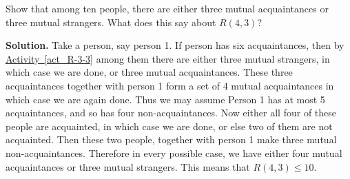 \documentclass{book}
\begin{document}
\setcounter{project}{49}
\addtocounter{project}{-1}
\begin{activity}[]\label{activity-42}
\hypertarget{p-439}{}%
Show that among ten people, there are either three mutual acquaintances or three mutual strangers.  What does this say about \(R(4,3)\)?%
\par\smallskip%
\noindent\textbf{Solution.}\hypertarget{solution-47}{}\quad%
\hypertarget{p-440}{}%
Take a person, say person 1. If person has six acquaintances, then by \hyperref[act_R-3-3]{Activity~\ref{act_R-3-3}} among them there are either three mutual strangers, in which case we are done, or three mutual acquaintances. These three acquaintances together with person 1 form a set of 4 mutual acquaintances in which case we are again done. Thus we may assume Person 1 has at most 5 acquaintances, and so has four non-acquaintances. Now either all four of these people are acquainted, in which case we are done, or else two of them are not acquainted. Then these two people, together with person 1 make three mutual non-acquaintances. Therefore in every possible case, we have either four mutual acquaintances or three mutual strangers. This means that \(R(4,3) \le 10\).%
\end{activity}
\end{document}
